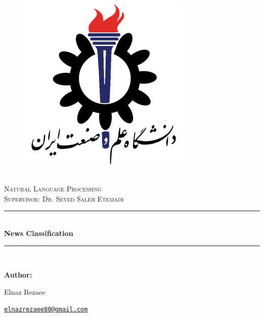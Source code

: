 \documentclass[12pt]{article}
\newcommand{\HRule}{\rule{\linewidth}{0.5mm}} %
\begin{document}
\begin{center}
    \begin{figure}
        \vspace{-1.0cm}
        \includegraphics[scale = 0.3, left]{Images/IUSTLogo.png} %
    \end{figure}
    \mbox{}\\[2.0cm]
    \textsc{\Huge Natural Language Processing}\\[2.5cm]
    \textsc{\LARGE Supervisor: Dr. Seyed Saleh Etemadi}\\[2.0cm]
    \HRule\\[0.4cm]
    {\large \bf {\selectfont News Classification}}\\[0.2cm]
    \HRule\\[1.5cm]
\end{center}

\begin{flushleft}
    \textbf{\selectfont Author:}
\end{flushleft}

\begin{center}
    \begin{minipage}{0.5\textwidth}
        \begin{flushleft}
            Elnaz Rezaee
        \end{flushleft}
    \end{minipage}%
    \begin{minipage}{0.5\textwidth}
        \begin{flushright}
            \href{mailto:joao.marafuz.gaspar@tecnico.ulisboa.pt}{\texttt{elnazrezaee80@gmail.com}}
        \end{flushright}
    \end{minipage}
\end{center}
    
\end{document}
